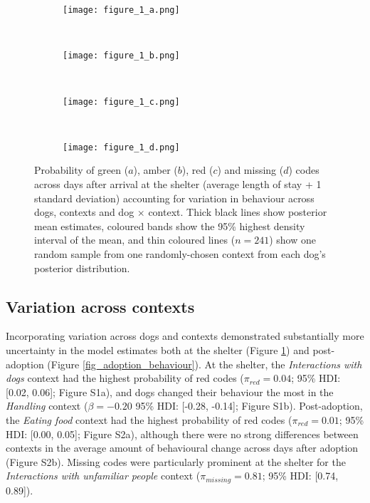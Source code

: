 \documentclass[12pt]{article}
\begin{document}
\begin{figure}[t!]
  \hspace{-2cm}%
  \begin{subfigure}{0.4\textwidth}
    \centering
    \texttt{[image: figure\_1\_a.png]}
  \end{subfigure}%
  ~%
  \hspace{-2cm}
  \begin{subfigure}{0.4\textwidth}
    \centering
    \texttt{[image: figure\_1\_b.png]}
  \end{subfigure}%
  ~%
  \hspace{-2cm}
  \begin{subfigure}{0.4\textwidth}
    \centering
    \texttt{[image: figure\_1\_c.png]}
  \end{subfigure}%
  ~%
  \hspace{-2cm}
  \begin{subfigure}{0.4\textwidth}
    \centering
    \texttt{[image: figure\_1\_d.png]}
  \end{subfigure}%

  \caption{Probability of green ($a$), amber ($b$), red ($c$) and missing ($d$) codes across days after arrival at the shelter (average length of stay + 1 standard deviation) accounting for variation in behaviour across dogs, contexts and dog $\times$ context. Thick black lines show posterior mean estimates, coloured bands show the 95\% highest density interval of the mean, and thin coloured lines ($n = 241$) show one random sample from one randomly-chosen context from each dog's posterior distribution.}
  \label{fig_shelter_behaviour}
\end{figure}

\subsection{Variation across contexts}
Incorporating variation across dogs and contexts demonstrated substantially more uncertainty in the model estimates both at the shelter (Figure \ref{fig_shelter_behaviour}) and post-adoption (Figure \ref{fig_adoption_behaviour}). At the shelter, the \textit{Interactions with dogs} context had the highest probability of red codes ($\pi_{red} = 0.04$; 95\% HDI: [0.02, 0.06]; Figure S1a), and dogs changed their behaviour the most in the \textit{Handling} context ($\beta = -0.20$ 95\% HDI: [-0.28, -0.14]; Figure S1b). Post-adoption, the \textit{Eating food}
context had the highest probability of red codes ($\pi_{red} = 0.01$; 95\% HDI: [0.00, 0.05]; Figure S2a), although there were no strong differences between contexts in the average amount of behavioural change across days after adoption (Figure S2b). Missing codes were particularly prominent at the shelter for the \textit{Interactions with unfamiliar people} context ($\pi_{missing} = 0.81$; 95\% HDI: [0.74, 0.89]).
\end{document}
